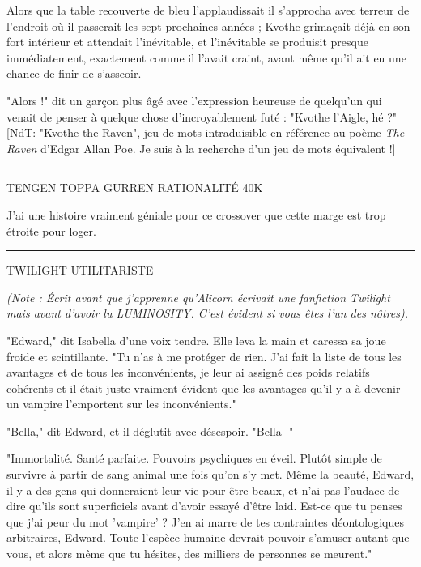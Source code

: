 Alors que la table recouverte de bleu l'applaudissait il s'approcha avec terreur de l'endroit où il passerait les sept prochaines années ; Kvothe grimaçait déjà en son fort intérieur et attendait l'inévitable, et l'inévitable se produisit presque immédiatement, exactement comme il l'avait craint, avant même qu'il ait eu une chance de finir de s'asseoir.

"Alors !" dit un garçon plus âgé avec l'expression heureuse de quelqu'un qui venait de penser à quelque chose d'incroyablement futé : "Kvothe l'Aigle, hé ?" [NdT: "Kvothe the Raven", jeu de mots intraduisible en référence au poème \emph{The Raven}  d'Edgar Allan Poe. Je suis à la recherche d'un jeu de mots équivalent !]
\par\noindent\rule{\textwidth}{0.4pt}

\begin{center}TENGEN TOPPA GURREN RATIONALITÉ 40K\end{center}


J'ai une histoire vraiment géniale pour ce crossover que cette marge est trop étroite pour loger.
\par\noindent\rule{\textwidth}{0.4pt}

\begin{center}TWILIGHT UTILITARISTE\end{center}


\emph{(Note : Écrit avant que j'apprenne qu'Alicorn écrivait une fanfiction Twilight mais avant d'avoir lu \MakeUppercase{Luminosity}. C'est évident si vous êtes l'un des nôtres).} 

"Edward," dit Isabella d'une voix tendre. Elle leva la main et caressa sa joue froide et scintillante. "Tu n'as à me protéger de rien. J'ai fait la liste de tous les avantages et de tous les inconvénients, je leur ai assigné des poids relatifs cohérents et il était juste vraiment évident que les avantages qu'il y a à devenir un vampire l'emportent sur les inconvénients."

"Bella," dit Edward, et il déglutit avec désespoir. "Bella -"

"Immortalité. Santé parfaite. Pouvoirs psychiques en éveil. Plutôt simple de survivre à partir de sang animal une fois qu'on s'y met. Même la beauté, Edward, il y a des gens qui donneraient leur vie pour être beaux, et n'ai pas l'audace de dire qu'ils sont superficiels avant d'avoir essayé d'être laid. Est-ce que tu penses que j'ai peur du mot 'vampire' ? J'en ai marre de tes contraintes déontologiques arbitraires, Edward. Toute l'espèce humaine devrait pouvoir s'amuser autant que vous, et alors même que tu hésites, des milliers de personnes se meurent."


